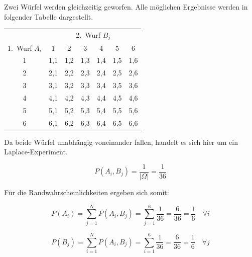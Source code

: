 \begin{beispiel}[Randwahrscheinlichkeit]
Zwei Würfel werden gleichzeitig geworfen. Alle möglichen Ergebnisse werden in folgender Tabelle dargestellt.

\begin{center}
\begin{tabular}{c|cccccc}
  & \multicolumn{6}{c}{2.\ Wurf $B_j$} \\
  1.\ Wurf $A_i$ & 1 & 2 & 3 & 4 & 5 & 6 \\
  \hline
  1 & 1,1 & 1,2 & 1,3 & 1,4 & 1,5 & 1,6 \\
  2 & 2,1 & 2,2 & 2,3 & 2,4 & 2,5 & 2,6 \\
  3 & 3,1 & 3,2 & 3,3 & 3,4 & 3,5 & 3,6 \\
  4 & 4,1 & 4,2 & 4,3 & 4,4 & 4,5 & 4,6 \\
  5 & 5,1 & 5,2 & 5,3 & 5,4 & 5,5 & 5,6 \\
  6 & 6,1 & 6,2 & 6,3 & 6,4 & 6,5 & 6,6 \\
\end{tabular}
\end{center}

Da beide Würfel unabhängig voneinander fallen, handelt es sich hier um ein Laplace-Experiment.

$$
P(A_i, B_j) = \frac{1}{|\Omega|} = \frac{1}{36}
$$

Für die Randwahrscheinlichkeiten ergeben sich somit:

$$
P(A_i) = \sum_{j=1}^{N} P(A_i, B_j) = \sum_{j=1}^{6} \frac{1}{36} = \frac{6}{36} = \frac{1}{6} \quad \forall i
$$

$$
P(B_j) = \sum_{i=1}^{N} P(A_i, B_j) = \sum_{i=1}^{6} \frac{1}{36} = \frac{6}{36} = \frac{1}{6} \quad \forall j
$$
\end{beispiel}
